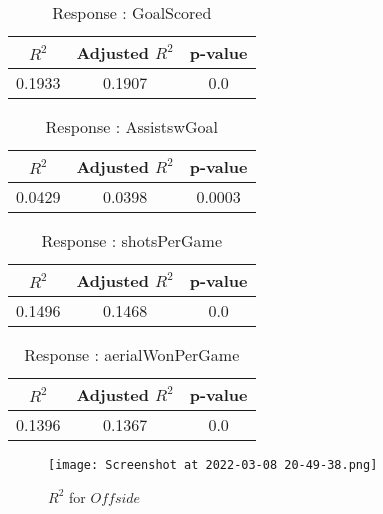 \documentclass[12pt]{article}
\begin{document}
\begin{minipage}{0.5\textwidth}
	\begin{table}[H]
	\centering
	\caption{Response : GoalScored}\label{table:1a}
	{\begin{tabular}{|c|c|c|}
			\hline
			$ R^2 $ & Adjusted $ R^2 $ & p-value \\
			\hline
			0.1933 & 0.1907 & 0.0 \\
			\hline
		\end{tabular}
	}
\end{table}
\begin{table}[H]
	\centering
	\caption{Response : AssistswGoal}\label{table:1a}
	{\begin{tabular}{|c|c|c|}
			\hline
			$ R^2 $ & Adjusted $ R^2 $ & p-value \\
			\hline
			0.0429 & 0.0398 & 0.0003 \\
			\hline
		\end{tabular}
	}
\end{table}
\end{minipage}
\hfill
\begin{minipage}{0.5\textwidth}
	\begin{table}[H]
	\centering
	\caption{Response : shotsPerGame }\label{table:1a}
	{\begin{tabular}{|c|c|c|}
			\hline
			$ R^2 $ & Adjusted $ R^2 $ & p-value \\
			\hline
			0.1496 & 0.1468 & 0.0 \\
			\hline
		\end{tabular}
	}
\end{table}
\begin{table}[H]
	\centering
	\caption{Response : aerialWonPerGame}\label{table:1a}
	{\begin{tabular}{|c|c|c|}
			\hline
			$ R^2 $ & Adjusted $ R^2 $ & p-value \\
			\hline
			0.1396 & 0.1367 & 0.0 \\
			\hline
		\end{tabular}
	}
\end{table}
\end{minipage}


\begin{figure}[H]
	\centering
	\texttt{[image: Screenshot at 2022-03-08 20-49-38.png]}
	\caption{$ R^2 $ for $ Offside $}
	\label{fig:1}
\end{figure}
\end{document}
